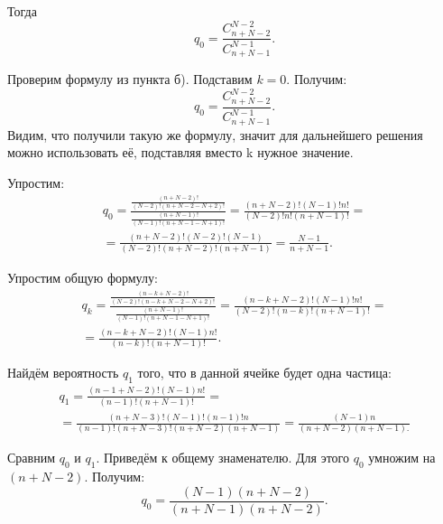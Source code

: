 \documentclass{book}
\begin{document}
Тогда
$$ q_0 =
\frac{C_{n+N-2}^{N-2}}{C_{n+N-1}^{N-1}}.$$

Проверим формулу из пункта б).
Подставим $ k = 0 $.
Получим:
$$ q_0 =
\frac{C_{n+N-2}^{N-2}}{C_{n+N-1}^{N-1}}.$$
Видим, что получили такую же формулу, значит для дальнейшего решения можно использовать её, подставляя вместо k нужное значение.

Упростим:
\begin{equation*}
\begin{split}
q_0 =
\frac{ \frac{ \left( n+N-2 \right)! }{ \left( N-2 \right)! \left( n+N-2-N+2 \right)!  } }{ \frac{ \left( n+N-1\right)! }{\left( N-1 \right)! \left( n+N-1-N+1 \right)!  } } =
\frac{ \left( n+N-2\right)! \left( N-1 \right)!n!}{ \left( N-2 \right)!n! \left( n+N-1 \right)! } = \\
= \frac{ \left( n+N-2 \right)! \left( N-2 \right)! \left( N-1 \right) }{ \left( N-2 \right)! \left( n+N-2 \right)! \left( n+N-1 \right) } =
\frac{N-1}{n+N-1}.
\end{split}
\end{equation*}

Упростим общую формулу:
\begin{equation*}
\begin{split}
q_k =
\frac{ \frac{ \left( n-k+N-2 \right)! }{ \left( N-2 \right)! \left( n-k+N-2-N+2 \right)! } }{ \frac{ \left( n+N-1 \right)!}{ \left( N-1 \right)! \left(n+N-1-N+1 \right)!} } =
\frac{ \left( n-k+N-2 \right)! \left( N-1 \right)!n!}{ \left( N-2 \right)! \left( n-k \right)! \left( n+N-1 \right)!} = \\
= \frac{ \left( n-k+N-2 \right)! \left( N-1 \right) n!}{ \left( n-k \right)! \left( n+N-1 \right)!}.
\end{split}
\end{equation*}

Найдём вероятность $ q_1 $ того, что в данной ячейке будет одна частица:
\begin{equation*}
\begin{split}
q_1 =
\frac{ \left( n-1+N-2 \right)! \left( N-1 \right) n!}{ \left( n-1 \right)! \left( n+N-1 \right)!} = \\
= \frac{ \left( n+N-3 \right)! \left( N-1 \right)! \left( n-1 \right)!n }{ \left( n-1 \right)! \left( n+N-3 \right)! \left( n+N-2 \right) \left( n+N-1 \right) } =
\frac{ \left( N-1 \right) n}{ \left( n+N-2 \right) \left( n+N-1 \right).}
\end{split}
\end{equation*}

Сравним $ q_0 $ и $ q_1 $.
Приведём к общему знаменателю.
Для этого $ q_0 $ умножим на $ \left( n+N-2 \right) $.
Получим:
$$ q_0 =
\frac{ \left( N-1 \right) \left( n+N-2 \right) }{ \left( n+N-1 \right) \left( n+N-2 \right) }.$$
\end{document}
